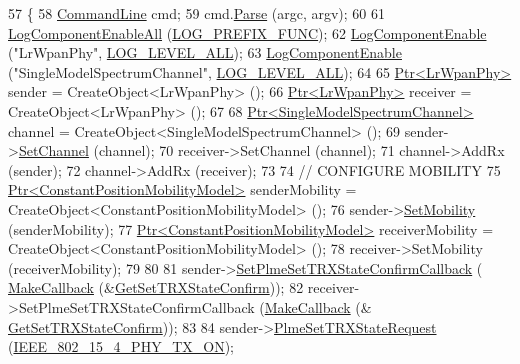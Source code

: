 \begin{DoxyCode}
57 \{
58   \hyperlink{classns3_1_1CommandLine}{CommandLine} cmd;
59   cmd.\hyperlink{classns3_1_1CommandLine_a5c10b85b3207e5ecb48d907966923156}{Parse} (argc, argv);
60   
61   \hyperlink{namespacens3_aef610a7dcaaa6c20499283526b538582}{LogComponentEnableAll} (\hyperlink{namespacens3_aa6464a4d69551a9cc968e17a65f39bdba0dd332264f60317e9a365095e80037d1}{LOG\_PREFIX\_FUNC});
62   \hyperlink{namespacens3_adc4ef4f00bb2f5f4edae67fc3bc27f20}{LogComponentEnable} (\textcolor{stringliteral}{"LrWpanPhy"}, \hyperlink{namespacens3_aa6464a4d69551a9cc968e17a65f39bdba022b1237a4fd1b08d034471df3c58586}{LOG\_LEVEL\_ALL});
63   \hyperlink{namespacens3_adc4ef4f00bb2f5f4edae67fc3bc27f20}{LogComponentEnable} (\textcolor{stringliteral}{"SingleModelSpectrumChannel"}, 
      \hyperlink{namespacens3_aa6464a4d69551a9cc968e17a65f39bdba022b1237a4fd1b08d034471df3c58586}{LOG\_LEVEL\_ALL});
64 
65   \hyperlink{classns3_1_1Ptr}{Ptr<LrWpanPhy>} sender = CreateObject<LrWpanPhy> ();
66   \hyperlink{classns3_1_1Ptr}{Ptr<LrWpanPhy>} receiver = CreateObject<LrWpanPhy> ();
67 
68   \hyperlink{classns3_1_1Ptr}{Ptr<SingleModelSpectrumChannel>} channel = 
      CreateObject<SingleModelSpectrumChannel> ();
69   sender->\hyperlink{classns3_1_1LrWpanPhy_adc8fc0181c802576d065a6d05f7b29ae}{SetChannel} (channel);
70   receiver->SetChannel (channel);
71   channel->AddRx (sender);
72   channel->AddRx (receiver);
73 
74   \textcolor{comment}{// CONFIGURE MOBILITY}
75   \hyperlink{classns3_1_1Ptr}{Ptr<ConstantPositionMobilityModel>} senderMobility = 
      CreateObject<ConstantPositionMobilityModel> ();
76   sender->\hyperlink{classns3_1_1LrWpanPhy_a9cd1699d839197cd6f491ee14f17d14f}{SetMobility} (senderMobility);
77   \hyperlink{classns3_1_1Ptr}{Ptr<ConstantPositionMobilityModel>} receiverMobility = 
      CreateObject<ConstantPositionMobilityModel> ();
78   receiver->SetMobility (receiverMobility);
79 
80 
81   sender->\hyperlink{classns3_1_1LrWpanPhy_a1f251e13ef1dfd58b5261f9e214f0a8f}{SetPlmeSetTRXStateConfirmCallback} (
      \hyperlink{group__makecallbackmemptr_ga9376283685aa99d204048d6a4b7610a4}{MakeCallback} (&\hyperlink{lr-wpan-phy-test_8cc_a23aec77831063efb6a3903cf1768523d}{GetSetTRXStateConfirm}));
82   receiver->SetPlmeSetTRXStateConfirmCallback (\hyperlink{group__makecallbackmemptr_ga9376283685aa99d204048d6a4b7610a4}{MakeCallback} (&
      \hyperlink{lr-wpan-phy-test_8cc_a23aec77831063efb6a3903cf1768523d}{GetSetTRXStateConfirm}));
83 
84   sender->\hyperlink{classns3_1_1LrWpanPhy_a250bd133e6781745e652c8f3a3c7badc}{PlmeSetTRXStateRequest} (\hyperlink{group__lr-wpan_gga6494269d13d45c511a07b7ccbb1de754aa595d552b56b89b363b800b9fcfbe67f}{IEEE\_802\_15\_4\_PHY\_TX\_ON});

\end{DoxyCode}
